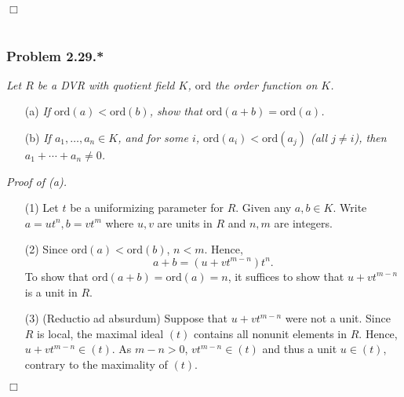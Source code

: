 \documentclass{article}
\begin{document}
$\Box$ \\\\






\subsubsection*{Problem 2.29.*}
\emph{Let $R$ be a DVR with quotient field $K$, $\mathrm{ord}$ the order function on $K$.}
\begin{enumerate}
\item[(a)]
  \emph{If $\mathrm{ord}(a) < \mathrm{ord}(b)$,
  show that $\mathrm{ord}(a + b) = \mathrm{ord}(a)$.}
\item[(b)]
  \emph{If $a_1, \ldots, a_n \in K$, and for some $i$,
  $\mathrm{ord}(a_i) < \mathrm{ord}(a_j)$ (all $j \neq i$),
  then $a_1 + \cdots + a_n \neq 0$.} \\
\end{enumerate}



\emph{Proof of (a).}
\begin{enumerate}
\item[(1)]
  Let $t$ be a uniformizing parameter for $R$.
  Given any $a, b \in K$.
  Write $a = ut^n, b = vt^m$ where $u, v$ are units in $R$ and $n, m$ are integers.

\item[(2)]
  Since $\mathrm{ord}(a) < \mathrm{ord}(b)$, $n < m$.
  Hence,
  \[
    a + b = (u + vt^{m-n}) t^n.
  \]
  To show that $\mathrm{ord}(a + b) = \mathrm{ord}(a) = n$,
  it suffices to show that $u + vt^{m-n}$ is a unit in $R$.

\item[(3)]
  (Reductio ad absurdum)
  Suppose that $u + vt^{m-n}$ were not a unit.
  Since $R$ is local, the maximal ideal $(t)$ contains all nonunit elements in $R$.
  Hence, $u + vt^{m-n} \in (t)$. As $m - n > 0$, $vt^{m-n} \in (t)$
  and thus a unit $u \in (t)$, contrary to the maximality of $(t)$.
\end{enumerate}
$\Box$ \\
\end{document}
